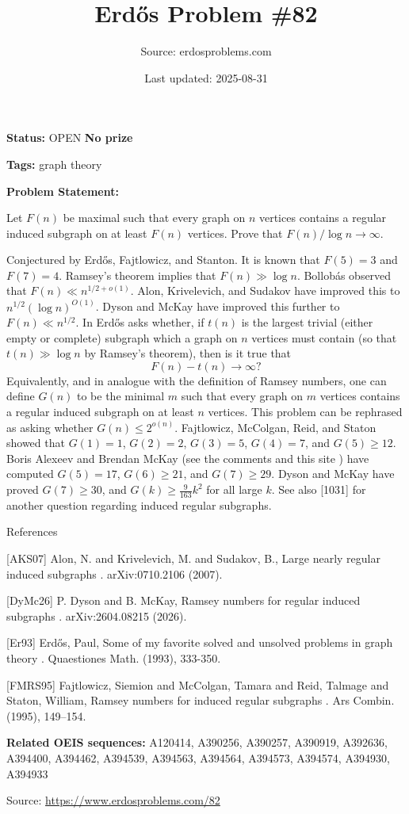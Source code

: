\documentclass{article}
\title{Erd\H{o}s Problem \#82}
\date{Last updated: 2025-08-31}
\author{Source: erdosproblems.com}
\begin{document}
\maketitle

\noindent\textbf{Status:} OPEN \quad \textbf{No prize}

\noindent\textbf{Tags:} graph theory

\medskip

\noindent\textbf{Problem Statement:}

Let $F(n)$ be maximal such that every graph on $n$ vertices contains a regular induced subgraph on at least $F(n)$ vertices. Prove that $F(n)/\log n\to \infty$.




Conjectured by Erd\H{o}s, Fajtlowicz, and Stanton. It is known that $F(5)=3$ and $F(7)=4$. Ramsey's theorem implies that $F(n)\gg \log n$. Bollob\'{a}s observed that $F(n)\ll n^{1/2+o(1)}$. Alon, Krivelevich, and Sudakov \cite{AKS07} have improved this to $n^{1/2}(\log n)^{O(1)}$. Dyson and McKay \cite{DyMc26} have improved this further to $F(n) \ll n^{1/2}$. In \cite{Er93} Erd\H{o}s asks whether, if $t(n)$ is the largest trivial (either empty or complete) subgraph which a graph on $n$ vertices must contain (so that $t(n) \gg \log n$ by Ramsey's theorem), then is it true that\[F(n)-t(n)\to \infty?\]Equivalently, and in analogue with the definition of Ramsey numbers, one can define $G(n)$ to be the minimal $m$ such that every graph on $m$ vertices contains a regular induced subgraph on at least $n$ vertices. This problem can be rephrased as asking whether $G(n) \leq 2^{o(n)}$. Fajtlowicz, McColgan, Reid, and Staton \cite{FMRS95} showed that $G(1)=1$, $G(2)=2$, $G(3)=5$, $G(4)=7$, and $G(5)\geq 12$. Boris Alexeev and Brendan McKay (see the comments and this site ) have computed $G(5)=17$, $G(6)\geq 21$, and $G(7)\geq 29$. Dyson and McKay \cite{DyMc26} have proved $G(7)\geq 30$, and $G(k)\geq \frac{9}{163}k^2$ for all large $k$. See also [1031] for another question regarding induced regular subgraphs.




References

[AKS07] Alon, N. and Krivelevich, M. and Sudakov, B., Large nearly regular induced subgraphs . arXiv:0710.2106 (2007).

[DyMc26] P. Dyson and B. McKay, Ramsey numbers for regular induced subgraphs . arXiv:2604.08215 (2026).

[Er93] Erd\H{o}s, Paul, Some of my favorite solved and unsolved problems in graph theory . Quaestiones Math. (1993), 333-350.

[FMRS95] Fajtlowicz, Siemion and McColgan, Tamara and Reid, Talmage and Staton, William, Ramsey numbers for induced regular subgraphs . Ars Combin. (1995), 149--154.

\noindent\textbf{Related OEIS sequences:} A120414, A390256, A390257, A390919, A392636, A394400, A394462, A394539, A394563, A394564, A394573, A394574, A394930, A394933


\bigskip
\noindent\small{Source: \url{https://www.erdosproblems.com/82}}
\end{document}
